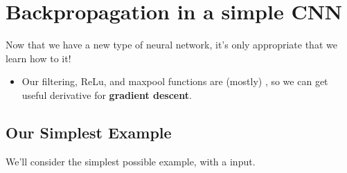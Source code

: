 \pagebreak

\section{Backpropagation in a simple CNN}

    Now that we have a new type of neural network, it's only appropriate that we learn how to  it!

    \begin{itemize}
        \item Our filtering, ReLu, and maxpool functions are (mostly) , so we can get useful derivative for \textbf{gradient descent}.
    \end{itemize}

    \subsection{Our Simplest Example}

        We'll consider the simplest possible example, with a  input. 
        
